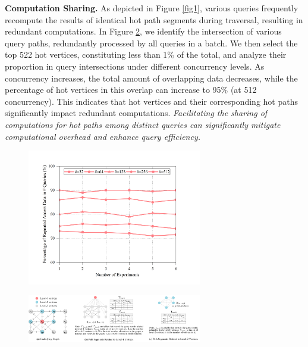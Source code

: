 \documentclass[10pt,journal,compsoc]{IEEEtran}
\begin{document}
{\bf{Computation Sharing.}}
As depicted in Figure \ref{fig1}, various queries frequently recompute the results of identical hot path segments during traversal, resulting in redundant computations.
In Figure \ref{fig4}, we identify the intersection of various query paths, redundantly processed by all queries in a batch. We then select the top 522 hot vertices, constituting less than 1\% of the total, and analyze their proportion in query intersections under different concurrency levels. As concurrency increases, the total amount of overlapping data decreases, while the percentage of hot vertices in this overlap can increase to 95\% (at 512 concurrency). This indicates that hot vertices and their corresponding hot paths significantly impact redundant computations.
\textit{Facilitating the sharing of computations for hot paths among distinct queries can significantly mitigate computational overhead and enhance query efficiency.}
\begin{figure}[t]
	\centering
	\includegraphics[width=3.0in]{picture/Zhang-fig3.png} %
    \captionsetup{labelsep=period}
		\caption{} %
		\label{fig3} %
\end{figure}

\begin{figure}[t]
	\centering
	\includegraphics[width=3.0in]{picture/Zhang-fig4.png}
    \captionsetup{labelsep=period}
		\caption{}
		\label{fig4}
            \vspace{-0.5cm}
\end{figure}
\end{document}
